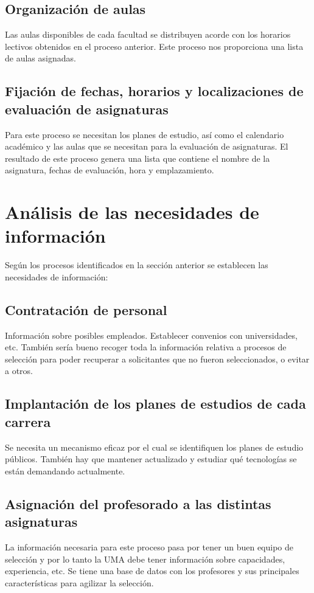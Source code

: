 \documentclass[11pt,a4paper,spanish,twoside]{book}
\begin{document}
\subsection{Organización de aulas}
Las aulas disponibles de cada facultad se distribuyen acorde con los horarios
lectivos obtenidos en el proceso anterior. Este proceso nos proporciona una
lista de aulas asignadas. 

\subsection{Fijación de fechas, horarios y localizaciones de evaluación de
  asignaturas}
Para este proceso se necesitan los planes de estudio, así como el calendario
académico y las aulas que se necesitan para la evaluación de asignaturas. El
resultado de este proceso genera una lista que contiene el nombre de la
asignatura, fechas de evaluación, hora y emplazamiento. 

\section{Análisis de las necesidades de información}
Según los procesos identificados en la sección anterior se establecen las
necesidades de información: 

\subsection{Contratación de personal}
Información sobre posibles empleados. Establecer convenios con universidades,
etc. También sería bueno recoger toda la información relativa a procesos de
selección para poder recuperar a solicitantes que no fueron seleccionados, o
evitar a otros.  

\subsection{Implantación de los planes de estudios de cada carrera}
Se necesita un mecanismo eficaz por el cual se identifiquen los planes de
estudio públicos. También hay que mantener actualizado y estudiar qué
tecnologías se están demandando actualmente.  

\subsection{Asignación del profesorado a las distintas asignaturas}
La información necesaria para este proceso pasa por tener un buen equipo de
selección y por lo tanto la UMA debe tener información sobre capacidades,
experiencia, etc.
Se tiene una base de datos con los profesores y sus principales
características para agilizar la selección. 
\end{document}
